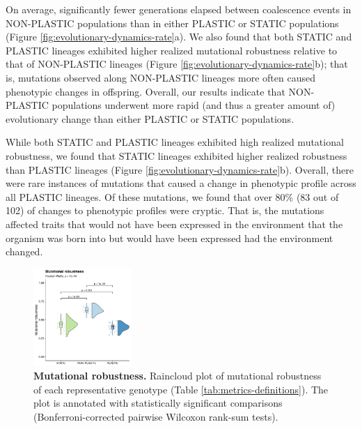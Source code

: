 \documentclass[utf8]{frontiersSCNS} %
\begin{document}
\begin{raggedbottom}
On average, significantly fewer generations elapsed between coalescence events in NON-PLASTIC populations than in either PLASTIC or STATIC populations (Figure \ref{fig:evolutionary-dynamics-rate}a).
We also found that both STATIC and PLASTIC lineages exhibited higher realized mutational robustness relative to that of NON-PLASTIC lineages (Figure \ref{fig:evolutionary-dynamics-rate}b); that is, mutations observed along NON-PLASTIC lineages more often caused phenotypic changes in offspring.
Overall, our results indicate that NON-PLASTIC populations underwent more rapid (and thus a greater amount of) evolutionary change than either PLASTIC or STATIC populations.

While both STATIC and PLASTIC lineages exhibited high realized mutational robustness, we found that STATIC lineages exhibited higher realized robustness than PLASTIC lineages (Figure \ref{fig:evolutionary-dynamics-rate}b).
Overall, there were rare instances of mutations that caused a change in phenotypic profile across all PLASTIC lineages.
Of these mutations, we found that over 80\% (83 out of 102) of changes to phenotypic profiles were cryptic.
That is, the mutations affected traits that would not have been expressed in the environment that the organism was born into but would have been expressed had the environment changed.

\begin{figure}[ht!]
  \centering
  \includegraphics[width=0.33\textwidth]{media-mutational-robustness.pdf}
  \caption{\small
      \textbf{Mutational robustness.}
      Raincloud plot of mutational robustness of each representative genotype (Table \ref{tab:metrics-definitions}).
      The plot is annotated with statistically significant comparisons (Bonferroni-corrected pairwise Wilcoxon rank-sum tests).
  }
  \label{fig:mutational-robustness}
\end{figure}


\end{raggedbottom}
\end{document}
